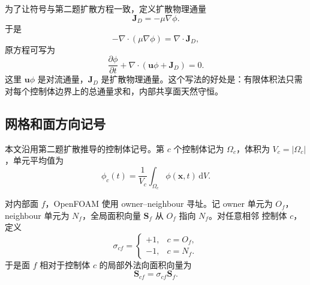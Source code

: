 \documentclass[UTF8,12pt,a4paper]{ctexart}
\numberwithin{equation}{section}
\newcommand{\dd}{\,\mathrm d}
\newcommand{\Sf}{\bm S}
\newcommand{\xf}{\bm x}
\newcommand{\uf}{\bm u}
\newcommand{\Jd}{\bm J_D}
\begin{document}
为了让符号与第二题扩散方程一致，定义扩散物理通量
\begin{equation}
  \Jd=-\mu\nabla\phi.
  \label{eq:diffusive_physical_flux}
\end{equation}
于是
\begin{equation}
  -\nabla\cdot(\mu\nabla\phi)=\nabla\cdot\Jd,
\end{equation}
原方程可写为
\begin{equation}
  \frac{\partial\phi}{\partial t}
  +
  \nabla\cdot(\uf\phi+\Jd)
  =
  0.
  \label{eq:conservative_form}
\end{equation}
这里 $\uf\phi$ 是对流通量，$\Jd$ 是扩散物理通量。这个写法的好处是：有限体积法只需
对每个控制体边界上的总通量求和，内部共享面天然守恒。

\subsection{网格和面方向记号}

本文沿用第二题扩散推导的控制体记号。第 $c$ 个控制体记为 $\Omega_c$，体积为
$V_c=|\Omega_c|$，单元平均值为
\begin{equation}
  \phi_c(t)=\frac{1}{V_c}\int_{\Omega_c}\phi(\xf,t)\dd V.
  \label{eq:cell_average}
\end{equation}

对内部面 $f$，OpenFOAM 使用 owner--neighbour 寻址。记 owner 单元为 $O_f$，
neighbour 单元为 $N_f$，全局面积向量 $\Sf_f$ 从 $O_f$ 指向 $N_f$。对任意相邻
控制体 $c$，定义
\begin{equation}
  \sigma_{cf}
  =
  \begin{cases}
    +1,&c=O_f,\\
    -1,&c=N_f.
  \end{cases}
  \label{eq:sigma}
\end{equation}
于是面 $f$ 相对于控制体 $c$ 的局部外法向面积向量为
\begin{equation}
  \Sf_{cf}=\sigma_{cf}\Sf_f.
  \label{eq:local_area_vector}
\end{equation}
\end{document}

